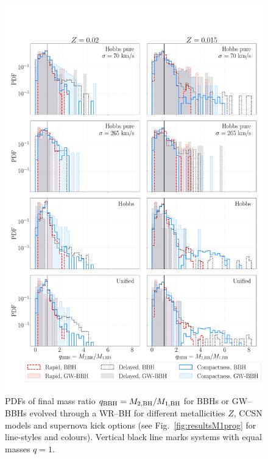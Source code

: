 \documentclass[a4paper,titlepage]{book}     	%
\begin{document}
\begin{figure}[h]
	\centering
	\includegraphics[width=\textwidth]{./images/remq.pdf}	
	\caption{PDFs of final mass ratio $q_{\rm BBH} = M_{\rm 2,BH}/M_{\rm 1,BH}$ for BBHs or GW--BBHs evolved through a WR--BH for different metallicities $Z$, CCSN models and supernova kick options (see Fig.\ \ref{fig:resultsM1prog} for line-styles and colours). Vertical black line marks systems with equal masses $q=1$.}\label{fig:resultsqrem}
\end{figure}
\end{document}
